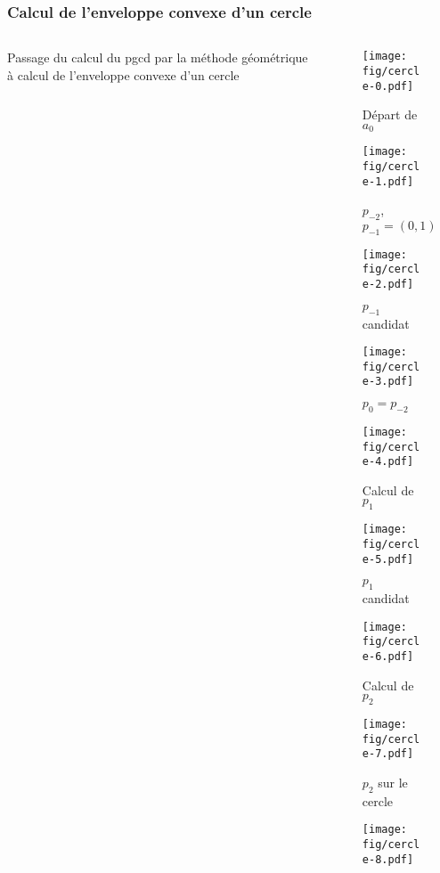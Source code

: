\documentclass{beamer}
\begin{document}
\begin{frame}
\frametitle{Calcul de l'enveloppe convexe d'un cercle}
\begin{columns}[t]
  \begin{column}{5cm}
  
  \begin{block}{}
    Passage du calcul du pgcd par la méthode géométrique à calcul de l'enveloppe convexe d'un cercle
  \end{block}
    
  \end{column}

  \begin{column}{4cm}
{
  \begin{figure}[h!]
    \centering
    \texttt{[image: fig/cercle-0.pdf]}
    \caption{Départ de $a_{0}$}
\end{figure}
}
{
  \begin{figure}[h!]
    \centering
    \texttt{[image: fig/cercle-1.pdf]}
    \caption{$p_{-2}$, $p_{-1}=(0,1)$}
\end{figure}
}
{
  \begin{figure}[h!]
    \centering
    \texttt{[image: fig/cercle-2.pdf]}
    \caption{$p_{-1}$ candidat}
\end{figure}
}
{
  \begin{figure}[h!]
    \centering
    \texttt{[image: fig/cercle-3.pdf]}
    \caption{$p_{0} = p_{-2}$}
\end{figure}
}
{
  \begin{figure}[h!]
    \centering
    \texttt{[image: fig/cercle-4.pdf]}
    \caption{Calcul de $p_{1}$}
\end{figure}
}
{
  \begin{figure}[h!]
    \centering
    \texttt{[image: fig/cercle-5.pdf]}
    \caption{$p_{1}$ candidat}
\end{figure}
}
{
  \begin{figure}[h!]
    \centering
    \texttt{[image: fig/cercle-6.pdf]}
    \caption{Calcul de $p_{2}$}
\end{figure}
}
{
  \begin{figure}[h!]
    \centering
    \texttt{[image: fig/cercle-7.pdf]}
    \caption{$p_{2}$ sur le cercle}
\end{figure}
}
{
  \begin{figure}[h!]
    \centering
    \texttt{[image: fig/cercle-8.pdf]}

\end{figure}}
\end{column}
\end{columns}
\end{frame}
\end{document}
